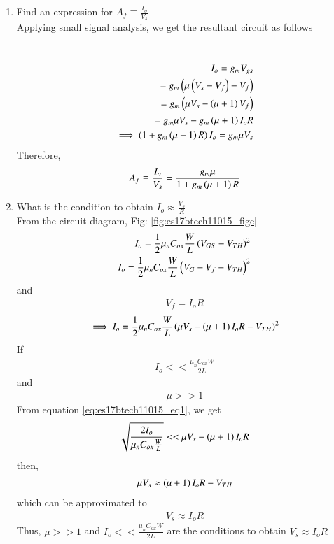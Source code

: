 \begin{enumerate}[label=\arabic*.,ref=\theenumi]
\item Find an expression for $A_f \equiv \frac{I_o}{V_s}$
\\
\solution  Applying small signal analysis, we get the resultant circuit as follows 
\begin{figure}[ht!]
	\begin{center}
	    \resizebox{\columnwidth/1}{!}{}
	\end{center}
	\caption{}
	\label{fig:es17btech11015_fig2}
\end{figure}\\
\begin{align}
I_o = g_mV_{gs}\\
= g_m\left(\mu\left(V_s-V_f\right)-V_f\right)\\
= g_m\left(\mu V_s-\left(\mu+1\right)V_f\right)\\
= g_m\mu V_s-g_m\left(\mu+1\right)I_oR\\
\implies \left(1+g_m\left(\mu+1\right)R\right)I_o = g_m\mu V_s\\
\end{align}
Therefore,
\begin{align}
    A_f \equiv \frac{I_o}{V_s} = \frac{g_m\mu}{1+g_m\left(\mu+1\right)R}
\end{align}

\item What is the condition to obtain $I_o\approx\frac{V_s}{R}$\\
\solution
From the circuit diagram, Fig: \ref{fig:es17btech11015_fige}
\begin{align}
    I_o = \frac{1}{2}\mu_nC_{ox}\frac{W}{L}\left(V_{GS}-V_{TH}\right)^2\\
    I_o = \frac{1}{2}\mu_nC_{ox}\frac{W}{L}\left(V_G-V_f-V_{TH}\right)^2
\end{align}
and \begin{align}
    V_f = I_oR
\end{align}
\begin{align}
    \implies I_o = \frac{1}{2}\mu_nC_{ox}\frac{W}{L}\left(\mu V_s-\left(\mu+1\right)I_oR-V_{TH}\right)^2
\label{eq:es17btech11015_eq1}    
\end{align}
If\begin{align}
    I_o << \frac{\mu_nC_{ox}W}{2L}
\end{align} and
\begin{align}
    \mu >> 1
\end{align}
From equation \eqref{eq:es17btech11015_eq1}, we get
\begin{align}
    \sqrt{\frac{2I_o}{\mu_nC_{ox}\frac{W}{L}}} << \mu V_s-\left(\mu+1\right)I_oR\\
\end{align}
then,\begin{align}
    \mu V_s \approx \left(\mu+1\right)I_oR-V_{TH}
\end{align}
which can be approximated to 
\begin{align}
    V_s \approx I_oR
\end{align}
Thus, $\mu>>1$ and $I_o<<\frac{\mu_nC_{ox}W}{2L}$ are the conditions to obtain $V_s \approx I_oR$
% 
\end{enumerate}



